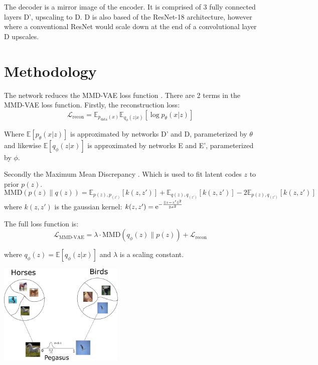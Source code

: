 \documentclass{article}
\begin{document}
The decoder is a mirror image of the encoder. It is comprised of 3 fully connected layers D', upscaling to D. D is also based of the ResNet-18 architecture, however where a conventional ResNet would scale down at the end of a convolutional layer D upscales.

\section{Methodology}
The network reduces the MMD-VAE loss function \cite{infovae}. 
There are 2 terms in the MMD-VAE loss function. Firstly, the reconstruction loss:
\begin{equation}
    \mathcal{L}_{\textrm{recon}} = \mathbb{E}_{p_{\textrm{data}}(x)} \mathbb{E}_{q_\phi (z|x)} [\log p_\theta(x|z)]
\end{equation}

Where $\mathbb{E}[p_\theta(x|z)]$ is approximated by networks D' and D, parameterized by $\theta$ and likewise $\mathbb{E}[q_\phi(z|x)]$ is approximated by networks E and E', parameterized by $\phi$.


Secondly the Maximum Mean Discrepancy \cite{mmd}. Which is used to fit latent codes $z$ to prior $p(z)$.
\begin{equation}
    \textrm{MMD}(p(z) \lVert q(z)) = \mathbb{E}_{p(z), p_(z')}[k(z, z')] + \mathbb{E}_{q(z), q_(z')}[k(z, z')] - 2 \mathbb{E}_{p(z), q_(z')}[k(z, z')]
\end{equation}
where $k(z, z')$ is the gaussian kernel: $k(z, z')={\rm e}^{-\frac{\lVert z-z' \rVert^2}{2\sigma^2}}$

The full loss function is:
\begin{equation}
    \mathcal{L}_\textrm{MMD-VAE} = \lambda \cdot \textrm{MMD}(q_\phi (z) \lVert p(z)) + \mathcal{L}_{\textrm{recon}}
\end{equation}

where $q_\phi(z) =  \mathbb{E}[q_\phi(z|x)]$ and $\lambda$ is a scaling constant.

\begin{center}
    \includegraphics[width=0.45\textwidth]{figures/clustering.png}
\end{center}
\end{document}
